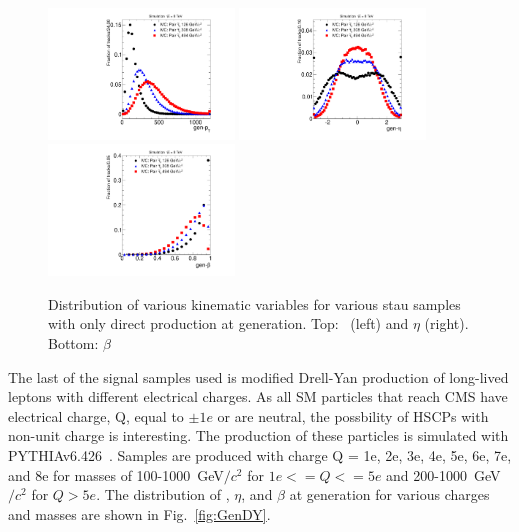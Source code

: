 \begin{figure}
 \begin{center}
  \includegraphics[clip=true, trim=0.0cm 0cm 1.4cm 0cm, width=0.44\textwidth]{figures/muonly/Selection_Comp_PPStau_genpT}
  \includegraphics[clip=true, trim=0.0cm 0cm 1.4cm 0cm, width=0.44\textwidth]{figures/muonly/Selection_Comp_PPStau_geneta}
  \includegraphics[clip=true, trim=0.0cm 0cm 1.4cm 0cm, width=0.44\textwidth]{figures/muonly/Selection_Comp_PPStau_genbeta}
 \end{center}
 \caption[Distribution of \pt, $\eta$, and $\beta$ for various Pair Prod. stau samples at generation]
{Distribution of various kinematic variables for various stau samples with only direct production at generation.
Top: \pt\ (left) and $\eta$ (right).
Bottom: $\beta$
   \label{fig:GenPPStau}}
\end{figure}

The last of the signal samples used is modified Drell-Yan production of long-lived leptons with different electrical charges.
As all SM particles that reach CMS have electrical charge, Q, equal to $\pm1e$ or
are neutral, the possbility of HSCPs with non-unit charge is interesting. 
The production of these particles is simulated with PYTHIAv6.426~\cite{Sjostrand:2006za}. 
Samples are produced with charge Q = 1e, 2e, 3e, 4e, 5e, 6e, 7e, and 8e for masses of 
100-1000~GeV$/c^2$ for $1e <= Q <= 5e$ and 200-1000~GeV$/c^2$ for $Q > 5e$.
The distribution of \pt, $\eta$, and $\beta$ at generation for various charges and masses are shown in Fig.~\ref{fig:GenDY}.

